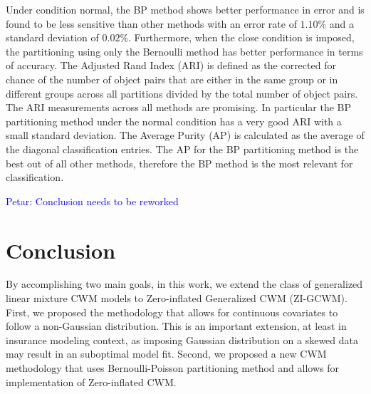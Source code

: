 \documentclass[12pt,letterpaper]{article}
\numberwithin{equation}{section}
\numberwithin{equation}{section}
\numberwithin{equation}{section}
\begin{document}
 Under condition normal, the BP method shows better performance in error and is found to be less sensitive than other methods with an error rate of $ 1.10 \% $ and a standard deviation of $ 0.02 \% $.  Furthermore, when the close condition is imposed, the partitioning using only the Bernoulli method has better performance in terms of accuracy. The Adjusted Rand Index (ARI) is defined as the corrected for chance of the number of object pairs that are either in the same group or in different groups across all partitions divided by the total number of object pairs.
 The ARI measurements across all methods are promising. In particular the BP partitioning method under the normal condition has a very good ARI with a small standard deviation. The Average Purity (AP) is calculated as the average of the diagonal classification entries. 
The AP for the BP partitioning method is the best out of all other methods, therefore the BP method is the most relevant for classification.


\textcolor{blue}{Petar: Conclusion needs to be reworked}

\section{Conclusion}

By accomplishing two main goals, in this work, we extend the class of generalized linear mixture CWM models to Zero-inflated Generalized CWM (ZI-GCWM). First, we proposed the methodology that allows for continuous covariates to follow a non-Gaussian distribution. This is an important extension, at least in insurance modeling context, as imposing Gaussian distribution on a skewed data may result in an suboptimal model fit. Second, we proposed a new CWM methodology that uses Bernoulli-Poisson partitioning method and allows for implementation of Zero-inflated CWM. 

\end{document}
